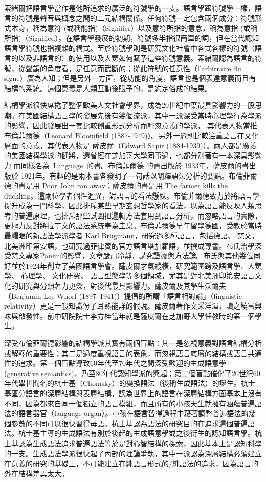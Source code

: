 索緒爾把語言學當作是他所追求的廣泛的符號學的一支。語言學跟符號學一樣，語言的符號是聲音與概念之間的二元結構關係。任何符號一定包含兩個成分：符號形式本身，稱為意符 (或稱能指)（Signifier）以及意符所指的意念，稱為意指 (或稱所指)（Signified）。在語言學發展的初期，符號多半指很簡單的詞，但在當代認知語言學符號也指複雜的構式。至於符號學則是研究文化社會中各式各樣的符號（語言的以及非語言的）的使用以及人類如何賦予這些符號意義。索緒爾認為語言的符號，從聲韻的角度看，是任意而武斷的；從此符號的任意性（l'arbitraire du signe）廣為人知；但是另外一方面，從功能的角度，語言也是個表達意義而且有結構的系統。這個意義是人類互動後賦予的，是約定俗成的結果。

結構學派很快席捲了整個歐美人文社會學界，成為20世紀中葉最具影響力的一股思潮。在美國結構語言學的發展先後有幾個流派，其中一派深受當時心理學行為學派的影響，因此發展出一套比較側重形式分析而輕忽意義的學派， 其代表人物當推布倫菲爾德（Leonard Bloomfield (1887-1949)）。另外一派則比較注重語言在文化層面的意義，其代表人物是 薩皮爾（Edward Sapir (1884-1939)）。兩人都是廣義的美國結構學派的健將，還曾經在芝加哥大學同事過，也都分別著有一本深具影響力 而同樣名為~Language~的書。布倫菲爾德 的書出版於 1933年，薩皮爾的書出版於 1921年。有趣的是兩本書各發明了一句話以闡釋語法分析的要點。布倫菲爾德的書是用  Poor John ran away；薩皮爾的書是用 The farmer kills the duckling。這兩位學者個性迴異，對語言的看法懸殊。布倫菲爾德致力於將語言學提升成為一門科學，因此排斥某些早期玄想哲學家的看法，以為語言能反映人類思考的普遍原理，也排斥那些試圖把邏輯方法套用到語言分析，而忽略語言的實際，更極力反對將拉丁文的語法系統奉為圭臬。布倫菲爾德早年留學德國，受教於當時最耀眼的新語法學派學者 Karl Brugmann，研究過多種語言，包括德語、 梵文，北美洲印第安語，也研究過菲律賓的官方語言塔加羅語，並撰成專書。布氏治學深受梵文專家Panini的影響，文章嚴肅冷靜，講究證據與方法論。布氏與其他幾位同好並於1924年創立了美國語言學會。薩皮爾才氣縱橫，研究範圍跨及語言學、人類學、 心理學、 文化研究、 語言型態學等多個領域，尤其是對北美洲印第安語言文化的研究與分類著力更深，對後代最具影響力。薩皮爾及其學生沃爾夫（Benjamin Lee Whorf (1897–1941)）提倡的所謂「語言相對論」（linguistic relativity）更是一般知識份子耳熟能詳的假說。薩皮爾著作文采洋溢，讀之饒富興味與啟發性。前中研院院士李方桂當年就是薩皮爾在芝加哥大學任教時的第一個學生。   

深受布倫菲爾德影響的結構學派其實有兩個盲點：其一是忽視意義對語言結構分析或解釋的重要性；其二是過度重視語言的表象，而忽視語言底層的結構或語言共通性的追求。第一個盲點導致60年代至70年代之間深受歡迎的生成語意學 (generative semantics)，乃至80年代認知學派的興起；第二個盲點催化了20世紀60年代舉世聞名的杭士基（Chomsky）的變換語法（後稱生成語法）的誕生。杭士基區分語言的深層結構與表層結構，認為世界上的語言在深層結構方面基本上沒有不同，因為都來自同一個獨立的語言模組，而且所有的小孩天生就擁有涵蘊普遍語法的語言器官（language organ）。小孩在語言習得過程中藉著調整普遍語法的幾個參數的不同可以很快習得母語。杭士基認為語法的研究目的在追求這個普遍語法。杭士基主導的生成語法有別於後起的生成語意學或之後衍生的認知語言學。杭士基認為生成語法追求普遍語法等於是對心智結構的探索，因此基本上是認知科學的一支。生成語法學派很快起了內部的理論爭執，其中一派認為深層結構必須建立在意義的研究的基礎上，不可能建立在純語言形式的/純語法的追求，因為語言的外在結構差異太大。

